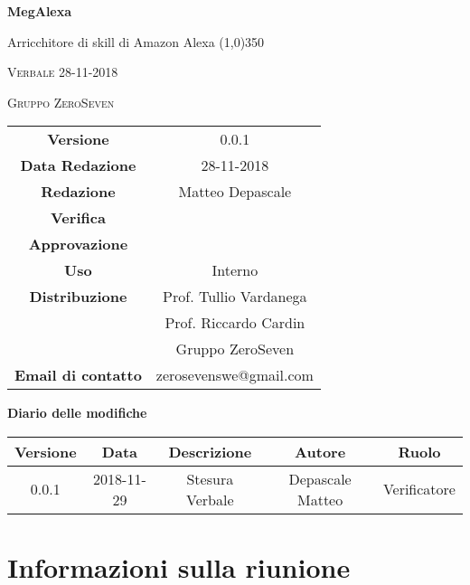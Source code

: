 \documentclass[a4paper,12pt]{article}
\author{Matteo Depascale}
\date{29-11-2018}
\begin{document}
\begin{titlepage}
	\centering
	{\huge\bfseries MegAlexa\par}
	Arricchitore di skill di Amazon Alexa
	\line(1,0){350} \\
	{\scshape\LARGE Verbale 28-11-2018 \par}
	\vspace{1cm}
	{\scshape Gruppo ZeroSeven \par}
	\logo
	\begin{tabular}{c|c}
		{\hfill \textbf{Versione}} 			& 0.0.1				\\
		{\hfill\textbf{Data Redazione}} 	& 28-11-2018		\\ 
		{\hfill\textbf{Redazione}} 			&  		Matteo Depascale			\\ 
		{\hfill\textbf{Verifica}} 				&  				\\ 
		{\hfill\textbf{Approvazione}} 		&  			\\ 
		{\hfill\textbf{Uso}} 					& 	Interno	\\ 
		{\hfill\textbf{Distribuzione}} 			& 			Prof. Tullio Vardanega \\ & Prof. Riccardo Cardin \\ & Gruppo ZeroSeven		\\ 
		{\hfill\textbf{Email di contatto}} & zerosevenswe@gmail.com \\
	\end{tabular}
\end{titlepage}
	

	
	\label{LastFrontPage}
	

	\newpage
	\cleardoublepage
	\begin{center}
		\textbf{Diario delle modifiche}
	\end{center}
	\begin{center}
		\begin{tabular}{|c|c|c|c|c|}
			\hline
			\textbf{Versione} & \textbf{Data} & \textbf{Descrizione} & \textbf{Autore} & \textbf{Ruolo} \\
			\hline
			0.0.1 & 2018-11-29 & Stesura Verbale & Depascale Matteo & Verificatore\\
			\hline
		\end{tabular}
	\end{center}
	
	\cleardoublepage
	\pagestyle{mymain}
	
	\tableofcontents
	\cleardoublepage
	
	\section{Informazioni sulla riunione}
\end{document}
